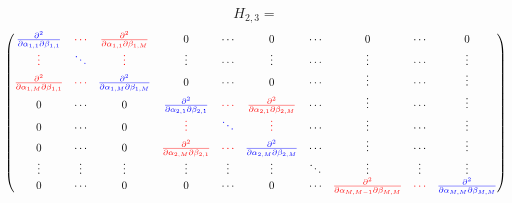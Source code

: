 $$ H_{2,3} = $$
\begin{equation}
\begin{pmatrix}
\textcolor{blue}{\frac{\partial^2 } {\partial \alpha_{1,1} \partial \beta_{1,1} }          } 
&
 \textcolor{red}{\cdots }
& 
 \textcolor{red}{\frac{\partial^2 }{\partial \alpha_{1,1} \partial \beta_{1,M} } } 
&
0 & \cdots & 0 & 
\cdots & 0 & 
 \cdots 
&
  0      
\\%
\textcolor{red}{\vdots  }     &  \textcolor{blue}{\ddots }  & \textcolor{red}{\vdots} & \vdots & \cdots & \vdots   & \cdots & \vdots & \cdots & \vdots  
\\%
\textcolor{red}{\frac{\partial^2 }{\partial \alpha_{1,M} \partial \beta_{1,1} } } & 
\textcolor{red}{\cdots}  & 
\textcolor{blue}{\frac{\partial^2 }{\partial \alpha_{1,M} \partial \beta_{1,M} }} & 
 0 & \cdots & 0 & \cdots   & \vdots & \cdots & \vdots     
\\%
0  & 
\cdots & 0 & 
\textcolor{blue}{\frac{\partial^2 } {\partial \alpha_{2,1} \partial \beta_{2,1} }} &
\textcolor{red}{\cdots} & 
\textcolor{red}{\frac{\partial^2 } {\partial \alpha_{2,1} \partial \beta_{2,M} }}      & 
\cdots & \vdots & \cdots & \vdots
\\%
0  & 
\cdots & 0 & 
\textcolor{red}{\vdots} &
\textcolor{blue}{\ddots }& 
\textcolor{red}{\vdots } & 
\cdots & \vdots & \cdots & \vdots
\\ %
0 &
\cdots & 0 & 
\textcolor{red}{\frac{\partial^2 } {\partial \alpha_{2,M} \partial \beta_{2,1} }} &
\textcolor{red}{\cdots} & 
\textcolor{blue}{\frac{\partial^2 } {\partial \alpha_{2,M} \partial \beta_{2,M} }}      & 
\cdots & \vdots & \cdots & \vdots
\\ %
\vdots    &
\vdots & 
\vdots      & 
\vdots & \vdots & \vdots & \ddots &
\vdots & 
\vdots & 
\vdots
\\ %
0      & 
\cdots & 
0      & 
0 & 
\cdots & 
0  & \cdots &
\textcolor{red}{\frac{\partial^2 } {\partial \alpha_{M,M-1} \partial \beta_{M,M} }} &
\textcolor{red}{\cdots} & 
\textcolor{blue}{\frac{\partial^2 } {\partial \alpha_{M,M} \partial \beta_{M,M} }}
\end{pmatrix}
\end{equation}


